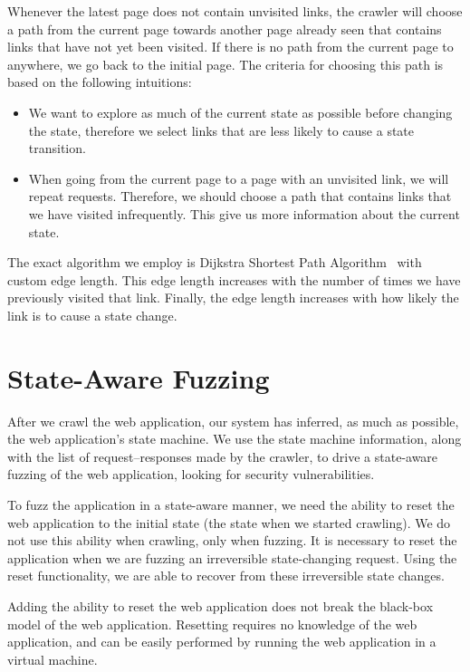 Whenever the latest page does not contain unvisited links, the crawler will
choose a path from the current page towards another page already seen that
contains links that have not yet been visited. If there is no path from the
current page to anywhere, we go back to the initial page. The criteria for choosing this
path is based on the following intuitions:
\begin{itemize}
 \item We want to explore as much of the current state as possible before
   changing the state, therefore we select links that are less likely to cause
   a state transition.
 \item When going from the current page to a page with an unvisited link, we
   will repeat requests. Therefore, we should choose a path that contains links
   that we have visited infrequently. This give us more information about the
   current state. 
\end{itemize}

The exact algorithm we employ is Dijkstra Shortest Path
Algorithm~\cite{dijkstra59:shortestpath} with custom edge length. This edge
length increases with the number of times we have previously visited that link.
Finally, the edge length increases with how likely the link is to cause a state
change.

\section{State-Aware Fuzzing}


After we crawl the web application, our system has inferred, as much as
possible, the web application's state machine. We use the state machine
information, along with the list of request--responses made by the crawler, to
drive a state-aware fuzzing of the web application, looking for security
vulnerabilities.

To fuzz the application in a state-aware manner, we need the ability to reset
the web application to the initial state (the state when we started crawling).
We do not use this ability when crawling, only when fuzzing. It is necessary to
reset the application when we are fuzzing an irreversible state-changing
request. Using the reset functionality, we are able to recover from these
irreversible state changes.

Adding the ability to reset the web application does not break the black-box
model of the web application. Resetting requires no knowledge of the web
application, and can be easily performed by running the web application in a
virtual machine.

